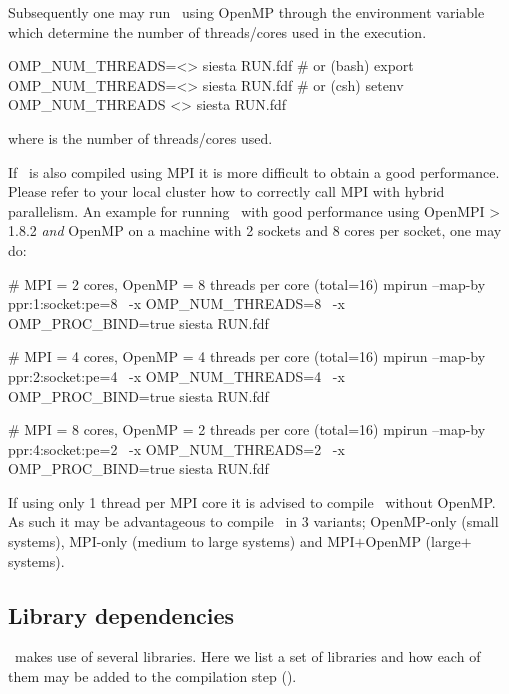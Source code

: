 %

Subsequently one may run \siesta\ using OpenMP through the environment
variable  which determine the number of
threads/cores used in the execution.
\begin{shellexample}
  OMP_NUM_THREADS=<> siesta RUN.fdf
  # or (bash)
  export OMP_NUM_THREADS=<>
  siesta RUN.fdf
  # or (csh)
  setenv OMP_NUM_THREADS <>
  siesta RUN.fdf
\end{shellexample}
where \shell{<>} is the number of threads/cores used.

If \siesta\ is also compiled using MPI it is more difficult to obtain
a good performance. Please refer to your local cluster how to
correctly call MPI with hybrid parallelism.
%
An example for running \siesta\ with good performance using OpenMPI >
1.8.2 \emph{and} OpenMP on a machine with 2 sockets and 8 cores per
socket, one may do:
\begin{shellexample}
  # MPI = 2 cores, OpenMP = 8 threads per core (total=16)
  mpirun --map-by ppr:1:socket:pe=8 \
     -x OMP_NUM_THREADS=8 \
     -x OMP_PROC_BIND=true siesta RUN.fdf

  # MPI = 4 cores, OpenMP = 4 threads per core (total=16)
  mpirun --map-by ppr:2:socket:pe=4 \
     -x OMP_NUM_THREADS=4 \
     -x OMP_PROC_BIND=true siesta RUN.fdf

  # MPI = 8 cores, OpenMP = 2 threads per core (total=16)
  mpirun --map-by ppr:4:socket:pe=2 \
     -x OMP_NUM_THREADS=2 \
     -x OMP_PROC_BIND=true siesta RUN.fdf
\end{shellexample}
If using only 1 thread per MPI core it is advised to compile \siesta\
without OpenMP. As such it may be advantageous to compile \siesta\ in
3 variants; OpenMP-only (small systems), MPI-only (medium to large
systems) and MPI$+$OpenMP (large$+$ systems).


\subsection{Library dependencies}
\label{sec:libs}
\index{compile!libraries}

\siesta\ makes use of several libraries. Here we list a set of
libraries and how each of them may be added to the compilation step
().

